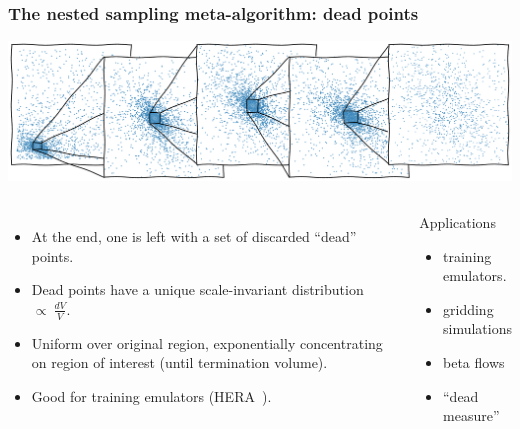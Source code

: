\documentclass[aspectratio=169]{beamer}
\begin{document}
\begin{frame}
    \frametitle{The nested sampling meta-algorithm: dead points}
    \includegraphics[width=\textwidth]{figures/dead_measure}
    \begin{columns}
        \begin{itemize}
            \item At the end, one is left with a set of discarded ``dead'' points.
            \item Dead points have a unique scale-invariant distribution $\propto\: \tfrac{dV}{V}$.
            \item Uniform over original region, exponentially concentrating on region of interest (until termination volume).
            \item Good for training emulators (HERA~).
        \end{itemize}
        \begin{block}{Applications}
            \begin{itemize}
                \item training emulators.
                \item gridding simulations
                \item beta flows
                \item ``dead measure'' 
            \end{itemize}
        \end{block}
    \end{columns}
\end{frame}
\end{document}
